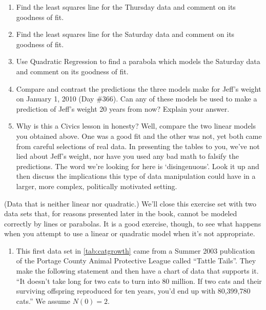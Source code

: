 \begin{exenum}
\begin{enumerate}

\item Find the least squares line for the Thursday data and comment on its goodness of fit.
\item Find the least squares line for the Saturday data and comment on its goodness of fit.
\item Use Quadratic Regression to find a parabola which models the Saturday data and comment on its goodness of fit.
\item Compare and contrast the predictions the three models make for Jeff's weight on January 1, 2010 (Day \#366).  Can any of these models be used to make a prediction of Jeff's weight 20 years from now?  Explain your answer.
\item Why is this a Civics lesson in honesty?  Well, compare the two linear models you obtained above.  One was a good fit and the other was not, yet both came from careful selections of real data.  In presenting the tables to you, we've  not lied about Jeff's weight, nor have you used any bad math to falsify the predictions.  The word we're looking for here is `disingenuous'.  Look it up and then discuss the implications this type of data manipulation could have in a larger, more complex, politically motivated setting.  

\end{enumerate}

\item (Data that is neither linear nor quadratic.)  We'll close this exercise set with two data sets that, for reasons presented later in the book, cannot be modeled correctly by lines or parabolas.  It is a good exercise, though, to see what happens when you attempt to use a linear or quadratic model when it's not appropriate.

\begin{enumerate}

\item \label{APLcats}
This first data set in \autoref{tab:catgrowth} came from a Summer 2003 publication of the Portage County Animal Protective League called ``Tattle Tails''.  They make the following statement and then have a chart of data that supports it. ``It doesn't take long for two cats to turn into 80 million.  If two cats and their surviving offspring reproduced for ten years, you'd end up with 80,399,780 cats.''  We assume $N(0) = 2$.

\begin{table}
\begin{center}
    

\end{center}
\end{table}
\end{enumerate}
\end{exenum}

